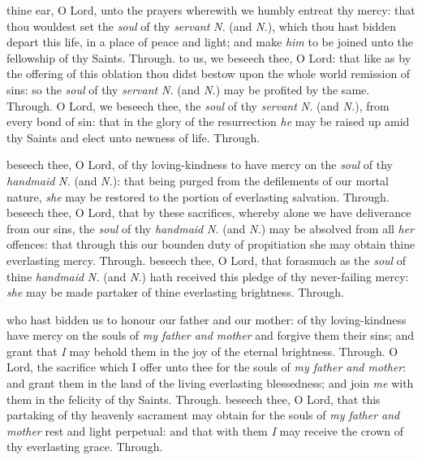 \begin{multicols}{2}
 thine ear, O Lord, unto the prayers wherewith we humbly entreat thy mercy: that thou wouldest set the \textit{soul} of thy \textit{servant} \textit{N.} (and \textit{N.}), which thou hast bidden depart this life, in a place of peace and light; and make \textit{him} to be joined unto the fellowship of thy Saints. Through.
 to us, we beseech thee, O Lord: that like as by the offering of this oblation thou didst bestow upon the whole world remission of sins: so the \textit{soul} of thy \textit{servant} \textit{N.} (and \textit{N.}) may be profited by the same. Through.
 O Lord, we beseech thee, the \textit{soul} of thy \textit{servant} \textit{N.} (and \textit{N.}), from every bond of sin: that in the glory of the resurrection \textit{he} may be raised up amid thy Saints and elect unto newness of life. Through.


 beseech thee, O Lord, of thy loving-kindness to have mercy on the \textit{soul} of thy \textit{handmaid} \textit{N.} (and \textit{N.}): that being purged from the defilements of our mortal nature, \textit{she} may be restored to the portion of everlasting salvation. Through.
 beseech thee, O Lord, that by these sacrifices, whereby alone we have deliverance from our sins, the \textit{soul} of thy \textit{handmaid} \textit{N.} (and \textit{N.}) may be absolved from all \textit{her} offences: that through this our bounden duty of propitiation she may obtain thine everlasting mercy. Through.
 beseech thee, O Lord, that forasmuch as the \textit{soul} of thine \textit{handmaid} \textit{N.} (and \textit{N.}) hath received this pledge of thy never-failing mercy: \textit{she} may be made partaker of thine everlasting brightness. Through.

 who hast bidden us to honour our father and our mother: of thy loving-kindness have mercy on the souls of \textit{my father and mother} and forgive them their sins; and grant that \textit{I} may behold them in the joy of the eternal brightness. Through.
 O Lord, the sacrifice which I offer unto thee for the souls of \textit{my father and mother}: and grant them in the land of the living everlasting blessedness; and join \textit{me} with them in the felicity of thy Saints. Through.
 beseech thee, O Lord, that this partaking of thy heavenly sacrament may obtain for the souls of \textit{my father and mother} rest and light perpetual: and that with them \textit{I} may receive the crown of thy everlasting grace. Through.


\end{multicols}
